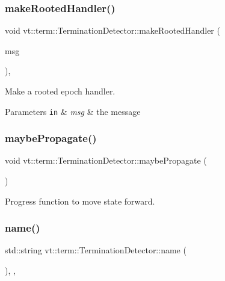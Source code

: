 \subsubsection{\texorpdfstring{make\+Rooted\+Handler()}{makeRootedHandler()}}
{\footnotesize\ttfamily void vt\+::term\+::\+Termination\+Detector\+::make\+Rooted\+Handler (\begin{DoxyParamCaption}\item[{\hyperlink{structvt_1_1term_1_1_term_msg}{Term\+Msg} $\ast$}]{msg }\end{DoxyParamCaption})\hspace{0.3cm}{\ttfamily [static]}, {\ttfamily [private]}}



Make a rooted epoch handler. 


\begin{DoxyParams}[1]{Parameters}
\mbox{\tt in}  & {\em msg} & the message \\
\hline
\end{DoxyParams}
\mbox{\label{structvt_1_1term_1_1_termination_detector_a4a54157fff0152b531b26c4a18393049}} 
\subsubsection{\texorpdfstring{maybe\+Propagate()}{maybePropagate()}}
{\footnotesize\ttfamily void vt\+::term\+::\+Termination\+Detector\+::maybe\+Propagate (\begin{DoxyParamCaption}{ }\end{DoxyParamCaption})}



Progress function to move state forward. 

\mbox{\label{structvt_1_1term_1_1_termination_detector_a6cffc7850bc178af04fb542d50f82086}} 
\subsubsection{\texorpdfstring{name()}{name()}}
{\footnotesize\ttfamily std\+::string vt\+::term\+::\+Termination\+Detector\+::name (\begin{DoxyParamCaption}{ }\end{DoxyParamCaption})\hspace{0.3cm}{\ttfamily [inline]}, {\ttfamily [override]}, {\ttfamily [virtual]}}



